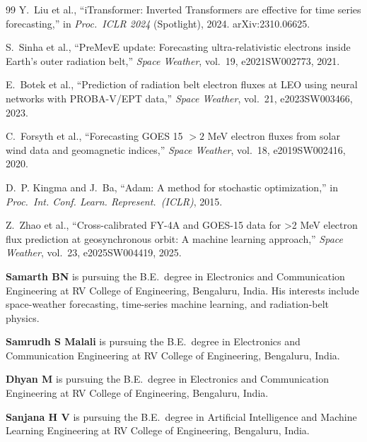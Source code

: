\documentclass{ieeeaccess}
\begin{document}
\begin{thebibliography}{99}
Y.~Liu et al., ``iTransformer: Inverted Transformers are effective for time
series forecasting,'' in \emph{Proc.\ ICLR 2024} (Spotlight), 2024.
arXiv:2310.06625.

S.~Sinha et al., ``PreMevE update: Forecasting ultra-relativistic electrons
inside Earth's outer radiation belt,'' \emph{Space Weather}, vol.~19,
e2021SW002773, 2021.


E.~Botek et al., ``Prediction of radiation belt electron fluxes at LEO using
neural networks with PROBA-V/EPT data,'' \emph{Space Weather}, vol.~21,
e2023SW003466, 2023.

C.~Forsyth et al., ``Forecasting GOES 15 \(>2\) MeV electron fluxes from
solar wind data and geomagnetic indices,'' \emph{Space Weather}, vol.~18,
e2019SW002416, 2020.

D.~P. Kingma and J.~Ba, ``Adam: A method for stochastic optimization,''
in \emph{Proc.\ Int. Conf. Learn. Represent.\ (ICLR)}, 2015.

Z.~Zhao et al., ``Cross-calibrated FY-4A and GOES-15 data for >2 MeV electron flux prediction at geosynchronous orbit: A machine learning approach,'' \emph{Space Weather}, vol.~23, e2025SW004419, 2025.

\end{thebibliography}

\vspace{3ex}
\noindent\textbf{Samarth BN} is pursuing the B.E.\ degree in Electronics and
Communication Engineering at RV College of Engineering, Bengaluru, India.
His interests include space-weather forecasting, time-series machine learning,
and radiation-belt physics.

\vspace{3ex}
\noindent\textbf{Samrudh S Malali} is pursuing the B.E.\ degree in Electronics and
Communication Engineering at RV College of Engineering, Bengaluru, India.

\vspace{3ex}
\noindent\textbf{Dhyan M} is pursuing the B.E.\ degree in Electronics and
Communication Engineering at RV College of Engineering, Bengaluru, India.

\vspace{3ex}
\noindent\textbf{Sanjana H V} is pursuing the B.E.\ degree in Artificial Intelligence and
Machine Learning Engineering at RV College of Engineering, Bengaluru, India.

\EOD
\end{document}
